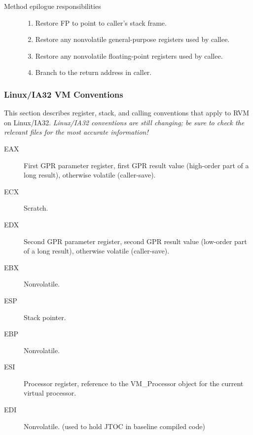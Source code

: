 \begin{description}
\item [Method epilogue responsibilities]

\begin{enumerate}
\item Restore FP to point to caller's stack frame.

\item Restore any nonvolatile general-purpose registers used by callee.

\item Restore any nonvolatile floating-point registers used by callee.

\item Branch to the return address in caller.
\end{enumerate}
\end{description}

\subsubsection{Linux/IA32 VM Conventions} \label{lintel-conventions}

This section describes register, stack, and calling conventions that
apply to RVM on Linux/IA32.  {\em Linux/IA32 conventions are still
changing; be sure to check the relevant files for the most accurate
information!}


\begin{description}
\item [EAX]
    First GPR parameter register, first GPR result value (high-order part
    of a long result), otherwise volatile (caller-save).

\item[ECX]
    Scratch.

\item[EDX]
    Second GPR parameter register, second GPR result value (low-order part
    of a long result), otherwise volatile (caller-save).

\item[EBX]
    Nonvolatile.

\item[ESP]
    Stack pointer.

\item[EBP]
    Nonvolatile.

\item[ESI]
    Processor register, reference to the VM\_Processor object for the current
    virtual processor.

\item[EDI]
    Nonvolatile.  (used to hold JTOC in baseline compiled code)

\end{description}

